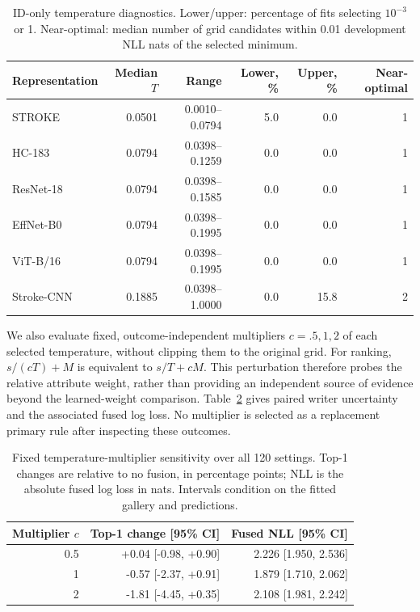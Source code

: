 \documentclass[10pt,a4paper]{article}
\begin{document}
\begin{table}[ht]
\centering\small
\caption{ID-only temperature diagnostics. Lower/upper: percentage of fits selecting $10^{-3}$ or 1. Near-optimal: median number of grid candidates within 0.01 development NLL nats of the selected minimum.}\label{tab:tempdiag}
\begin{tabular}{lrrrrr}\toprule
Representation & Median $T$ & Range & Lower, \% & Upper, \% & Near-optimal\\\midrule
STROKE & 0.0501 & 0.0010--0.0794 & 5.0 & 0.0 & 1 \\
HC-183 & 0.0794 & 0.0398--0.1259 & 0.0 & 0.0 & 1 \\
ResNet-18 & 0.0794 & 0.0398--0.1585 & 0.0 & 0.0 & 1 \\
EffNet-B0 & 0.0794 & 0.0398--0.1995 & 0.0 & 0.0 & 1 \\
ViT-B/16 & 0.0794 & 0.0398--0.1995 & 0.0 & 0.0 & 1 \\
Stroke-CNN & 0.1885 & 0.0398--1.0000 & 0.0 & 15.8 & 2 \\
\bottomrule

\end{tabular}
\end{table}

We also evaluate fixed, outcome-independent multipliers $c=.5,1,2$ of each selected temperature, without clipping them to the original grid. For ranking, $s/(cT)+M$ is equivalent to $s/T+cM$. This perturbation therefore probes the relative attribute weight, rather than providing an independent source of evidence beyond the learned-weight comparison. Table~\ref{tab:tempsensitivity} gives paired writer uncertainty and the associated fused log loss. No multiplier is selected as a replacement primary rule after inspecting these outcomes.

\begin{table}[ht]
\centering\small
\caption{Fixed temperature-multiplier sensitivity over all 120 settings. Top-1 changes are relative to no fusion, in percentage points; NLL is the absolute fused log loss in nats. Intervals condition on the fitted gallery and predictions.}\label{tab:tempsensitivity}
\begin{tabular}{rrr}\toprule
Multiplier $c$ & Top-1 change [95\% CI] & Fused NLL [95\% CI]\\\midrule
0.5 & +0.04 [-0.98, +0.90] & 2.226 [1.950, 2.536] \\
1 & -0.57 [-2.37, +0.91] & 1.879 [1.710, 2.062] \\
2 & -1.81 [-4.45, +0.35] & 2.108 [1.981, 2.242] \\
\bottomrule

\end{tabular}
\end{table}
\end{document}
